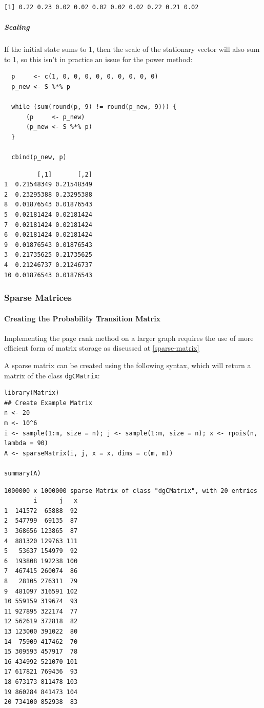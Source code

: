 \documentclass[11pt]{article}
\begin{document}
\begin{verbatim}
[1] 0.22 0.23 0.02 0.02 0.02 0.02 0.02 0.22 0.21 0.02
\end{verbatim}

\subparagraph{Scaling}
\label{scaling}
If the initial state sums to 1, then the scale of the stationary
vector will also sum to 1, so this isn't in practice an issue for the power method:

\begin{verbatim}
  p     <- c(1, 0, 0, 0, 0, 0, 0, 0, 0, 0)
  p_new <- S %*% p

  while (sum(round(p, 9) != round(p_new, 9))) {
      (p     <- p_new)
      (p_new <- S %*% p)
  }

  cbind(p_new, p)
\end{verbatim}

\begin{verbatim}
         [,1]       [,2]
1  0.21548349 0.21548349
2  0.23295388 0.23295388
8  0.01876543 0.01876543
5  0.02181424 0.02181424
7  0.02181424 0.02181424
6  0.02181424 0.02181424
9  0.01876543 0.01876543
3  0.21735625 0.21735625
4  0.21246737 0.21246737
10 0.01876543 0.01876543
\end{verbatim}

\subsubsection{Sparse Matrices}
\label{sec:org01f7513}
\paragraph{Creating the Probability Transition Matrix}
\label{sec:orga1c6747}
Implementing the page rank method on a larger graph requires the use of more
efficient form of matrix storage as discussed at \ref{sparse-matrix}

A sparse matrix can be created using the following syntax, which will return a
matrix of the class \texttt{dgCMatrix}:

\begin{verbatim}
library(Matrix)
## Create Example Matrix
n <- 20
m <- 10^6
i <- sample(1:m, size = n); j <- sample(1:m, size = n); x <- rpois(n, lambda = 90)
A <- sparseMatrix(i, j, x = x, dims = c(m, m))

summary(A)
\end{verbatim}

\begin{verbatim}
1000000 x 1000000 sparse Matrix of class "dgCMatrix", with 20 entries
        i      j   x
1  141572  65888  92
2  547799  69135  87
3  368656 123865  87
4  881320 129763 111
5   53637 154979  92
6  193808 192238 100
7  467415 260074  86
8   28105 276311  79
9  481097 316591 102
10 559159 319674  93
11 927895 322174  77
12 562619 372818  82
13 123000 391022  80
14  75909 417462  70
15 309593 457917  78
16 434992 521070 101
17 617821 769436  93
18 673173 811478 103
19 860284 841473 104
20 734100 852938  83
\end{verbatim}
\end{document}
